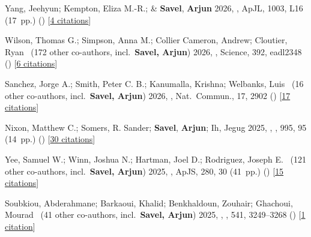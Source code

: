 \item[{\color{numcolor}\scriptsize46}] Yang, Jeehyun; Kempton, Eliza M.-R.; \& \textbf{Savel}, \textbf{Arjun} 2026, , ApJL, {1003}, L16 (17~pp.) () [\href{https://ui.adsabs.harvard.edu/abs/2026ApJ..1003L..16Y}{4 citations}]

\item[{\color{numcolor}\scriptsize45}] Wilson, Thomas G.; Simpson, Anna M.; Collier Cameron, Andrew; Cloutier, Ryan \etal{}\ ({172} other co-authors, incl.\ \textbf{Savel, Arjun}) 2026, , Science, {392}, eadl2348 () [\href{https://ui.adsabs.harvard.edu/abs/2026Sci...392..271W}{6 citations}]

\item[{\color{numcolor}\scriptsize44}] Sanchez, Jorge A.; Smith, Peter C. B.; Kanumalla, Krishna; Welbanks, Luis \etal{}\ ({16} other co-authors, incl.\ \textbf{Savel, Arjun}) 2026, , Nat.\ Commun., {17}, 2902 () [\href{https://ui.adsabs.harvard.edu/abs/2026NatCo..17.2902S}{17 citations}]

\item[{\color{numcolor}\scriptsize43}] Nixon, Matthew C.; Somers, R. Sander; \textbf{Savel}, \textbf{Arjun}; Ih, Jegug \etal{} 2025, , \apj, {995}, 95 (14~pp.) () [\href{https://ui.adsabs.harvard.edu/abs/2025ApJ...995...95N}{30 citations}]

\item[{\color{numcolor}\scriptsize42}] Yee, Samuel W.; Winn, Joshua N.; Hartman, Joel D.; Rodriguez, Joseph E. \etal{}\ ({121} other co-authors, incl.\ \textbf{Savel, Arjun}) 2025, , ApJS, {280}, 30 (41~pp.) () [\href{https://ui.adsabs.harvard.edu/abs/2025ApJS..280...30Y}{15 citations}]

\item[{\color{numcolor}\scriptsize41}] Soubkiou, Abderahmane; Barkaoui, Khalid; Benkhaldoun, Zouhair; Ghachoui, Mourad \etal{}\ ({41} other co-authors, incl.\ \textbf{Savel, Arjun}) 2025, , \mnras, {541}, 3249--3268 () [\href{https://ui.adsabs.harvard.edu/abs/2025MNRAS.541.3249S}{1 citation}]

